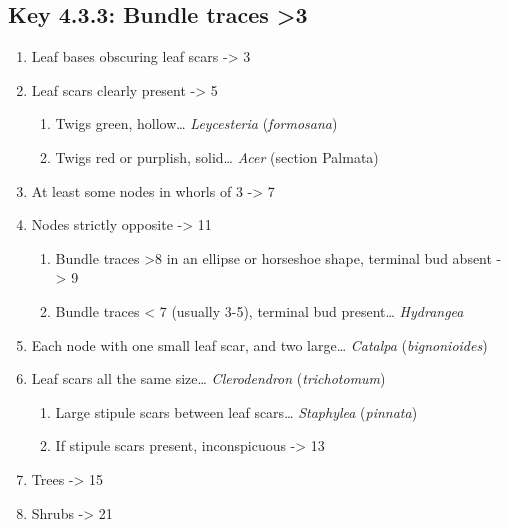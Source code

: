\documentclass[openany]{book}
\providecommand{\tightlist}{%
  \setlength{\itemsep}{0pt}\setlength{\parskip}{0pt}}
\begin{document}
\hypertarget{key-4.3.3-bundle-traces-3}{%
\subsection*{Key 4.3.3: Bundle traces \textgreater{}3}\label{key-4.3.3-bundle-traces-3}}

\begin{enumerate}
\def\labelenumi{\arabic{enumi}.}
\tightlist
\item
  Leaf bases obscuring leaf scars -\textgreater{} 3
\item
  Leaf scars clearly present -\textgreater{} 5

  \begin{enumerate}
  \def\labelenumii{\arabic{enumii}.}
  \setcounter{enumii}{2}
  \tightlist
  \item
    Twigs green, hollow\ldots{} \emph{Leycesteria} (\emph{formosana})
  \item
    Twigs red or purplish, solid\ldots{} \emph{Acer} (section Palmata)
  \end{enumerate}
\item
  At least some nodes in whorls of 3 -\textgreater{} 7
\item
  Nodes strictly opposite -\textgreater{} 11

  \begin{enumerate}
  \def\labelenumii{\arabic{enumii}.}
  \setcounter{enumii}{6}
  \tightlist
  \item
    Bundle traces \textgreater{}8 in an ellipse or horseshoe shape, terminal bud absent -\textgreater{} 9
  \item
    Bundle traces \textless{} 7 (usually 3-5), terminal bud present\ldots{} \emph{Hydrangea}
  \end{enumerate}
\item
  Each node with one small leaf scar, and two large\ldots{} \emph{Catalpa} (\emph{bignonioides})
\item
  Leaf scars all the same size\ldots{} \emph{Clerodendron} (\emph{trichotomum})

  \begin{enumerate}
  \def\labelenumii{\arabic{enumii}.}
  \setcounter{enumii}{10}
  \tightlist
  \item
    Large stipule scars between leaf scars\ldots{} \emph{Staphylea} (\emph{pinnata})
  \item
    If stipule scars present, inconspicuous -\textgreater{} 13
  \end{enumerate}
\item
  Trees -\textgreater{} 15
\item
  Shrubs -\textgreater{} 21


\end{enumerate}
\end{document}
